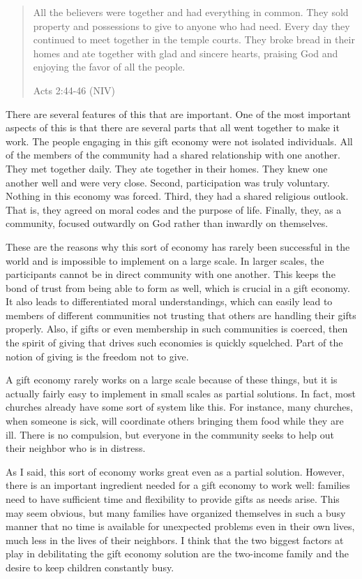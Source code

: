 \begin{quote}
All the believers were together and had everything in common. They sold
property and possessions to give to anyone who had need. Every day they
continued to meet together in the temple courts. They broke bread in
their homes and ate together with glad and sincere hearts, praising God
and enjoying the favor of all the people. 

Acts 2:44-46 (NIV)
\end{quote}

There are several features of this that are important. One of the most
important aspects of this is that there are several parts that all went
together to make it work. The people engaging in this gift economy were
not isolated individuals. All of the members of the community had a
shared relationship with one another. They met together daily. They ate
together in their homes. They knew one another well and were very
close. Second, participation was truly voluntary. Nothing in this
economy was forced. Third, they had a shared religious outlook. That
is, they agreed on moral codes and the purpose of life. Finally, they,
as a community, focused outwardly on God rather than inwardly on
themselves.

These are the reasons why this sort of economy has rarely been
successful in the world and is impossible to implement on a large
scale. In larger scales, the participants cannot be in direct community
with one another. This keeps the bond of trust from being able to form
as well, which is crucial
in a gift economy. It
also leads to differentiated moral understandings, which can easily
lead to members of different communities not trusting that
others are handling
their gifts properly. Also, if gifts or even membership in such
communities is coerced, then the spirit of giving that drives such
economies is quickly squelched. Part of the notion of giving is the
freedom not to give.

A gift economy rarely works on a large scale
because of these
things, but it is actually fairly easy to implement in small scales as
partial solutions. In fact, most churches already have some sort of
system like this. For instance, many churches, when someone is sick,
will coordinate others bringing them food while they are ill. There is
no compulsion, but everyone in the community seeks to help out their
neighbor who is in distress. 

As I said, this sort of economy works great even as a partial solution.
However, there is an important ingredient needed for a gift economy to
work well: families need to have sufficient time and flexibility to
provide gifts as needs arise. This may seem obvious, but many families
have organized themselves in such a busy manner that no time is
available for unexpected problems even in their own lives, much less in
the lives of their neighbors.  I think that the two biggest
factors at play in
debilitating the gift economy solution are the two-income family and
the desire to
keep children
constantly busy.

